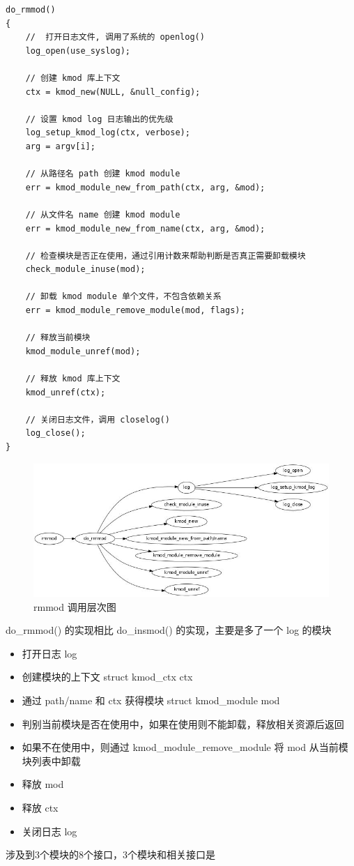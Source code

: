 {\begin{shaded}\begin{verbatim}
do_rmmod()
{
    //  打开日志文件, 调用了系统的 openlog()
    log_open(use_syslog);

    // 创建 kmod 库上下文 
    ctx = kmod_new(NULL, &null_config);

    // 设置 kmod log 日志输出的优先级
    log_setup_kmod_log(ctx, verbose);
    arg = argv[i];

    // 从路径名 path 创建 kmod module
    err = kmod_module_new_from_path(ctx, arg, &mod);

    // 从文件名 name 创建 kmod module
    err = kmod_module_new_from_name(ctx, arg, &mod);

    // 检查模块是否正在使用，通过引用计数来帮助判断是否真正需要卸载模块
    check_module_inuse(mod);

    // 卸载 kmod module 单个文件，不包含依赖关系
    err = kmod_module_remove_module(mod, flags);

    // 释放当前模块
    kmod_module_unref(mod);

    // 释放 kmod 库上下文
    kmod_unref(ctx);

    // 关闭日志文件，调用 closelog()
    log_close();
}
\end{verbatim}\end{shaded}}
\begin{figure}[htbp]
\centering
\includegraphics{./figures/rmmod.jpg}
\caption{rmmod 调用层次图}
\end{figure}

do\_rmmod() 的实现相比 do\_insmod() 的实现，主要是多了一个 log 的模块

\begin{itemize}
\item
  打开日志 log
\item
  创建模块的上下文 struct kmod\_ctx ctx
\item
  通过 path/name 和 ctx 获得模块 struct kmod\_module mod
\item
  判别当前模块是否在使用中，如果在使用则不能卸载，释放相关资源后返回
\item
  如果不在使用中，则通过 kmod\_module\_remove\_module 将 mod
  从当前模块列表中卸载
\item
  释放 mod
\item
  释放 ctx
\item
  关闭日志 log
\end{itemize}
涉及到3个模块的8个接口，3个模块和相关接口是


